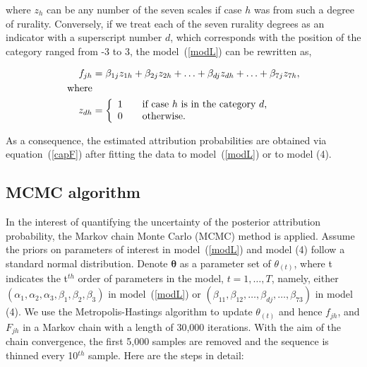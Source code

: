 \documentclass[times, doublespace]{simauth}%
\begin{document}
where $z_{h}$ can be any number of the seven scales if case $h$ was from such a degree of rurality. Conversely, if we treat each of the seven rurality degrees as an indicator with a superscript number $d$, which corresponds with the position of the category ranged from -3 to 3, the model~(\ref{modL}) can be rewritten as,

\begin{align}
  f_{jh} & = \beta_{1j} z_{1h}+ \beta_{2j} z_{2h} + \ldots + \beta_{dj} z_{dh} + \ldots +  \beta_{7j} z_{7h}, \\
  \text{where} & \notag\\
z_{dh} & =
\left\{\begin{array}{rcl}
1 && \mbox{if case $h$ is in the category $d$,} \notag \\ 0 && \mbox{otherwise}. 
\end{array}\right.
  \label{modC}
\end{align}

As a consequence, the estimated attribution probabilities are obtained via equation~(\ref{capF}) after fitting the data to model~(\ref{modL}) or to model (4).

\subsection{MCMC algorithm}
In the interest of quantifying the uncertainty of the posterior attribution probability, the Markov chain Monte Carlo (MCMC) method is applied. Assume the priors on parameters of interest in model~(\ref{modL}) and model (4) follow a standard normal distribution. Denote $\boldsymbol{\theta}$ as a parameter set of $\theta_{(t)}$, where t indicates the t$^{th}$ order of parameters in the model, $t=1, \ldots, T$, namely, either $(\alpha_1, \alpha_2, \alpha_3, \beta_1, \beta_2, \beta_3)$ in model~(\ref{modL}) or $(\beta_{11}, \beta_{12}, \ldots, \beta_{dj}, \ldots, \beta_{73})$ in model (4). We use the Metropolis-Hastings algorithm to update $\theta_{(t)}$ and hence $f_{jh}$, and $ F_{jh}$ in a Markov chain with a length of 30,000 iterations. With the aim of the chain convergence, the first 5,000 samples are removed and the sequence is thinned every 10$^{th}$ sample. Here are the steps in detail:
\end{document}

